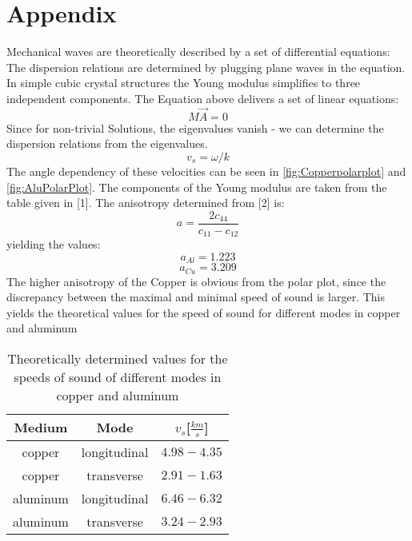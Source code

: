 \documentclass[a4paper,10pt,twocolumn]{article}
\begin{document}
    \section{Appendix}\label{sec:appendix}
    Mechanical waves are theoretically described by a set of differential equations:
    The dispersion relations are determined by plugging plane waves in the equation.
    In simple cubic crystal structures the Young modulus simplifies to three independent components.
    The Equation above delivers a set of linear equations:
    \begin{equation}
        M{\vec{A}} = 0
    \end{equation}
    Since for non-trivial Solutions, the eigenvalues vanish - we can determine the dispersion relations from the eigenvalues.
    \begin{equation}
        v_s = \omega / k
    \end{equation}
    The angle dependency of these velocities can be seen in \autoref{fig:Copperpolarplot} and \autoref{fig:AluPolarPlot}.
    The components of the Young modulus are taken from the table given in [1].
    The anisotropy determined from [2] is:
    \begin{equation}
        a = \frac{2c_{44}}{c_{11} - c_{12}}
    \end{equation}
    yielding the values:
    \begin{equation}
        a_{Al} = 1.223
    \end{equation}
    \begin{equation}
        a_{Cu} = 3.209
    \end{equation}
    The higher anisotropy of the Copper is obvious from the polar plot, since the discrepancy between the maximal and minimal speed of sound is larger.
    This yields the theoretical values for the speed of sound for different modes in copper and aluminum
    \begin{table}[htbp]
        \centering
        \begin{tabular*}{0.9\linewidth}{@{\extracolsep{\fill}}ccc}
            \hline
            \hline
            \rule[-7pt]{0pt}{23pt}  Medium & Mode & $v_s$[$\frac{km}{s}$] 	 \\
            \hline
            \rule[-5pt]{0pt}{23pt}    copper   & longitudinal & $4.98 - 4.35$	 \\
            \rule[-5pt]{0pt}{23pt}    copper   & transverse &   $2.91 - 1.63$  \\
            \rule[-5pt]{0pt}{23pt}    aluminum   & longitudinal & $6.46-6.32$  \\
            \rule[-5pt]{0pt}{23pt}    aluminum   & transverse & $3.24 - 2.93$  \\
            \hline
            \hline
        \end{tabular*}
        \normalsize
        \caption[]{Theoretically determined values for the speeds of sound of different modes in copper and aluminum}
        \label{tab:TheoreticalSpeeds}
    \end{table}
\end{document}
